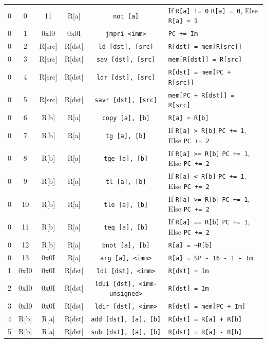 \documentclass{article}
\begin{document}
\begin{table}[h!]
\begin{footnotesize}
\begin{tabular}{cccc|c|l}
 			0 & 0 & 11 & R[a] & \texttt{not [a]} & If \texttt{R[a] != 0} \texttt{R[a] = 0}, Else \texttt{R[a] = 1} \\
			0 & 1 & 0xI0 & 0x0I & \texttt{jmpri <imm>} & \texttt{PC += Im} \\
			0 & 2 & R[src] & R[dst] & \texttt{ld [dst], [src]} & \texttt{R[dst] = mem[R[src]]} \\
			0 & 3 & R[src] & R[dst] & \texttt{sav [dst], [src]} & \texttt{mem[R[dst]] = R[src]} \\
			0 & 4 & R[src] & R[dst] & \texttt{ldr [dst], [src]} & \texttt{R[dst] = mem[PC + R[src]]} \\
			0 & 5 & R[src] & R[dst] & \texttt{savr [dst], [src]} & \texttt{mem[PC + R[dst]] = R[src]} \\
			0 & 6 & R[b] & R[a] & \texttt{copy [a], [b]} & \texttt{R[a] = R[b]} \\
			0 & 7 & R[b] & R[a] & \texttt{tg [a], [b]} & If \texttt{R[a] > R[b]} \texttt{PC += 1}, Else \texttt{PC += 2} \\
			0 & 8 & R[b] & R[a] & \texttt{tge [a], [b]} & If \texttt{R[a] >= R[b]} \texttt{PC += 1}, Else \texttt{PC += 2} \\
			0 & 9 & R[b] & R[a] & \texttt{tl [a], [b]} & If \texttt{R[a] < R[b]} \texttt{PC += 1}, Else \texttt{PC += 2} \\
			0 & 10 & R[b] & R[a] & \texttt{tle [a], [b]} & If \texttt{R[a] >= R[b]} \texttt{PC += 1}, Else \texttt{PC += 2} \\
			0 & 11 & R[b] & R[a] & \texttt{teq [a], [b]} & If \texttt{R[a] == R[b]} \texttt{PC += 1}, Else \texttt{PC += 2} \\
			0 & 12 & R[b] & R[a] & \texttt{bnot [a], [b]} & \texttt{R[a] = \textasciitilde R[b]} \\
			0 & 13 & 0x0I & R[a] & \texttt{arg [a], <imm>} & \texttt{R[a] = SP - 16 - 1 - Im} \\
			1 & 0xI0 & 0x0I & R[dst] & \texttt{ldi [dst], <imm>} & \texttt{R[dst] = Im} \\
			2 & 0xI0 & 0x0I & R[dst] & \texttt{ldui [dst], <imm-unsigned>} & \texttt{R[dst] = Im} \\
			3 & 0xI0 & 0x0I & R[dst] & \texttt{ldir [dst], <imm>} & \texttt{R[dst] = mem[PC + Im]} \\
			4 & R[b] & R[a] & R[dst] & \texttt{add [dst], [a], [b]} & \texttt{R[dst] = R[a] + R[b]} \\
			5 & R[b] & R[a] & R[dst] & \texttt{sub [dst], [a], [b]} & \texttt{R[dst] = R[a] - R[b]} \\

\end{tabular}
\end{footnotesize}
\end{table}
\end{document}

